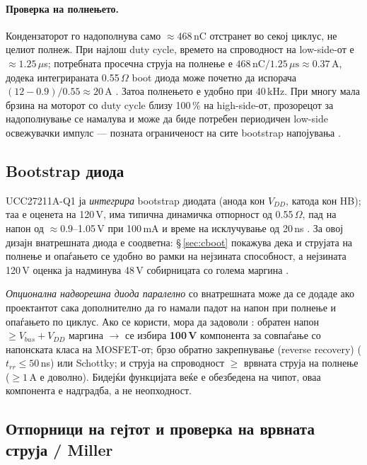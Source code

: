 \documentclass[11pt,a4paper]{article}
\newcommand{\eng}[1]{\textenglish{#1}}
\begin{document}
\paragraph{Проверка на полнењето.} Кондензаторот го надополнува само $\approx 468$\,nC отстранет во секој циклус, не целиот полнеж. При најлош \eng{duty cycle}, времето на спроводност на \eng{low-side}-от е $\approx 1.25\,\mu$s; потребната просечна струја на полнење е $468\,\mathrm{nC}/1.25\,\mu\mathrm{s} \approx 0.37$\,A, додека интегрираната 0.55\,$\Omega$ \eng{boot} диода може почетно да испорача $(12-0.9)/0.55 \approx 20$\,A \cite{ref3}. Затоа полнењето е удобно при 40\,kHz. При многу мала брзина на моторот со \eng{duty cycle} близу 100\,\% на \eng{high-side}-от, прозорецот за надополнување се намалува и може да биде потребен периодичен \eng{low-side} освежувачки импулс --- позната ограниченост на сите \eng{bootstrap} напојувања \cite{ref6,ref8}.

\subsection{Bootstrap диода}

UCC27211A-Q1 ја \emph{интегрира} \eng{bootstrap} диодата (анода кон $V_{DD}$, катода кон HB); таа е оценета на 120\,V, има типична динамичка отпорност од 0.55\,$\Omega$, пад на напон од $\approx 0.9$--1.05\,V при 100\,mA и време на исклучување од 20\,ns \cite{ref3}. За овој дизајн внатрешната диода е соодветна: \S\,\ref{sec:cboot} покажува дека и струјата на полнење и опаѓањето се удобно во рамки на нејзината способност, а нејзината 120\,V оценка ја надминува 48\,V собирницата со голема маргина \cite{ref3}.

\emph{Опционална надворешна диода паралелно} со внатрешната може да се додаде ако проектантот сака дополнително да го намали падот на напон при полнење и опаѓањето по циклус. Ако се користи, мора да задоволи \cite{ref6,ref8}: обратен напон $\ge V_{bus} + V_{DD}$ маргина $\rightarrow$ се избира \textbf{100\,V} компонента за совпаѓање со напонската класа на MOSFET-от; брзо обратно закрепнување (\eng{reverse recovery}) ($t_{rr}\le 50$\,ns) или \eng{Schottky}; и струја на спроводност $\ge$ врвната струја на полнење ($\ge 1$\,A е доволно). Бидејќи функцијата веќе е обезбедена на чипот, оваа компонента е надградба, а не неопходност.

\subsection{Отпорници на гејтот и проверка на врвната струја / Miller}
\label{sec:gateR}
\end{document}

